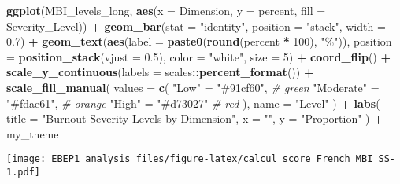 \documentclass[
]{article}
\newenvironment{Shaded}{\begin{snugshade}}{\end{snugshade}}
\newcommand{\AttributeTok}[1]{\textcolor[rgb]{0.13,0.29,0.53}{#1}}
\newcommand{\CommentTok}[1]{\textcolor[rgb]{0.56,0.35,0.01}{\textit{#1}}}
\newcommand{\DecValTok}[1]{\textcolor[rgb]{0.00,0.00,0.81}{#1}}
\newcommand{\FloatTok}[1]{\textcolor[rgb]{0.00,0.00,0.81}{#1}}
\newcommand{\FunctionTok}[1]{\textcolor[rgb]{0.13,0.29,0.53}{\textbf{#1}}}
\newcommand{\NormalTok}[1]{#1}
\newcommand{\OtherTok}[1]{\textcolor[rgb]{0.56,0.35,0.01}{#1}}
\newcommand{\SpecialCharTok}[1]{\textcolor[rgb]{0.81,0.36,0.00}{\textbf{#1}}}
\newcommand{\StringTok}[1]{\textcolor[rgb]{0.31,0.60,0.02}{#1}}
\begin{document}
\begin{Shaded}
\begin{Highlighting}[]
\FunctionTok{ggplot}\NormalTok{(MBI\_levels\_long, }\FunctionTok{aes}\NormalTok{(}\AttributeTok{x =}\NormalTok{ Dimension, }\AttributeTok{y =}\NormalTok{ percent, }\AttributeTok{fill =}\NormalTok{ Severity\_Level)) }\SpecialCharTok{+}
  \FunctionTok{geom\_bar}\NormalTok{(}\AttributeTok{stat =} \StringTok{"identity"}\NormalTok{, }\AttributeTok{position =} \StringTok{"stack"}\NormalTok{, }\AttributeTok{width =} \FloatTok{0.7}\NormalTok{) }\SpecialCharTok{+}
  \FunctionTok{geom\_text}\NormalTok{(}\FunctionTok{aes}\NormalTok{(}\AttributeTok{label =} \FunctionTok{paste0}\NormalTok{(}\FunctionTok{round}\NormalTok{(percent }\SpecialCharTok{*} \DecValTok{100}\NormalTok{), }\StringTok{"\%"}\NormalTok{)),}
            \AttributeTok{position =} \FunctionTok{position\_stack}\NormalTok{(}\AttributeTok{vjust =} \FloatTok{0.5}\NormalTok{),}
            \AttributeTok{color =} \StringTok{"white"}\NormalTok{, }\AttributeTok{size =} \DecValTok{5}\NormalTok{) }\SpecialCharTok{+}
  \FunctionTok{coord\_flip}\NormalTok{() }\SpecialCharTok{+}
  \FunctionTok{scale\_y\_continuous}\NormalTok{(}\AttributeTok{labels =}\NormalTok{ scales}\SpecialCharTok{::}\FunctionTok{percent\_format}\NormalTok{()) }\SpecialCharTok{+}
  \FunctionTok{scale\_fill\_manual}\NormalTok{(}
    \AttributeTok{values =} \FunctionTok{c}\NormalTok{(}
      \StringTok{"Low"} \OtherTok{=} \StringTok{"\#91cf60"}\NormalTok{,       }\CommentTok{\# green}
      \StringTok{"Moderate"} \OtherTok{=} \StringTok{"\#fdae61"}\NormalTok{,  }\CommentTok{\# orange}
      \StringTok{"High"} \OtherTok{=} \StringTok{"\#d73027"}     \CommentTok{\# red}
\NormalTok{    ),}
    \AttributeTok{name =} \StringTok{"Level"}
\NormalTok{  ) }\SpecialCharTok{+}
  \FunctionTok{labs}\NormalTok{(}
    \AttributeTok{title =} \StringTok{"Burnout Severity Levels by Dimension"}\NormalTok{,}
    \AttributeTok{x =} \StringTok{""}\NormalTok{,}
    \AttributeTok{y =} \StringTok{"Proportion"}
\NormalTok{  ) }\SpecialCharTok{+}
\NormalTok{  my\_theme}
\end{Highlighting}
\end{Shaded}

\texttt{[image: EBEP1\_analysis\_files/figure-latex/calcul score French MBI SS-1.pdf]}
\end{document}
